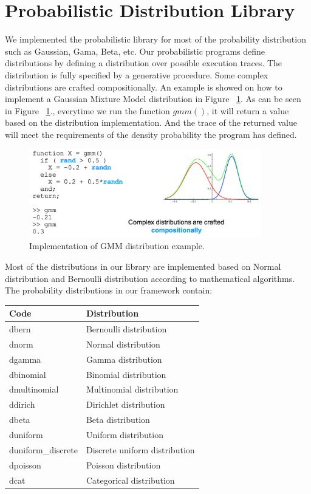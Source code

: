 \section{Probabilistic Distribution Library}
\label{sec:distr}
We implemented the probabilistic library for most of the probability distribution such as Gaussian, Gama, Beta, etc. Our probabilistic programs define distributions by defining a distribution over possible execution traces. The distribution is fully specified by a generative procedure. Some complex distributions are crafted compositionally. An example is showed on how to implement a Gaussian Mixture Model distribution in Figure ~\ref{fig:gmm}. As can be seen in Figure ~\ref{fig:gmm}., everytime we run the function $gmm()$, it will return a value based on the distribution implementation. And the trace of the returned value will meet the requirements of the density probability the program has defined.

\begin{figure}
    \centering
    \includegraphics[width=0.9\textwidth]{figures/gmm.png}
    \caption{Implementation of GMM distribution example.}
    \label{fig:gmm}
\end{figure}

Most of the distributions in our library are implemented based on Normal distribution and Bernoulli distribution according to mathematical algorithms. The probability distributions in our framework contain:

\begin{center}
\begin{tabular}{|l|l|}
  \hline
  Code & Distribution \\
  \hline
  dbern & Bernoulli distribution \\
  dnorm & Normal distribution \\
  dgamma & Gamma distribution \\ 
  dbinomial & Binomial distribution \\
  dmultinomial & Multinomial distribution \\
  ddirich & Dirichlet distribution\\
  dbeta & Beta distribution \\
  duniform & Uniform distribution \\
  duniform\_discrete & Discrete uniform distribution \\
  dpoisson & Poisson distribution \\
  dcat & Categorical distribution \\
  \hline
\end{tabular}
\end{center}

